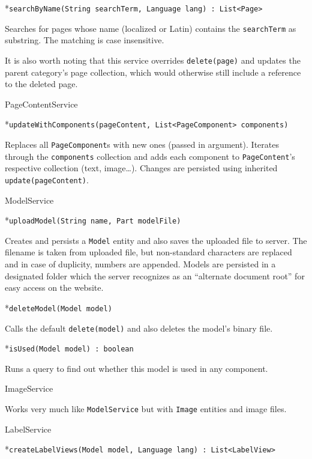 *{\tt searchByName(String searchTerm, Language lang) : List<Page>}

Searches for pages whose name (localized or Latin) contains the {\tt searchTerm} as substring. The matching is case insensitive.

\enditems

It is also worth noting that this service overrides {\tt delete(page)} and updates the parent category’s page collection, which would otherwise still include a reference to the deleted page.

\secc PageContentService

\begitems

*{\tt updateWithComponents(pageContent, List<PageComponent> components)}

Replaces all {\tt PageComponent}s with new ones (passed in argument). Iterates through the {\tt components} collection and adds each component to {\tt PageContent}’s respective collection (text, image…). Changes are persisted using inherited {\tt update(pageContent)}.

\enditems

\secc ModelService

\begitems

*{\tt uploadModel(String name, Part modelFile)}

Creates and persists a {\tt Model} entity and also saves the uploaded file to server. The filename is taken from uploaded file, but non-standard characters are replaced and in case of duplicity, numbers are appended. Models are persisted in a designated folder which the server recognizes as an “alternate document root” for easy access on the website.

*{\tt deleteModel(Model model)}

Calls the default {\tt delete(model)} and also deletes the model’s binary file.

*{\tt isUsed(Model model) : boolean}

Runs a  query to find out whether this model is used in any component.

\enditems

\secc ImageService

Works very much like {\tt ModelService} but with {\tt Image} entities and image files.

\secc LabelService

\begitems

*{\tt createLabelViews(Model model, Language lang) : List<LabelView>}

